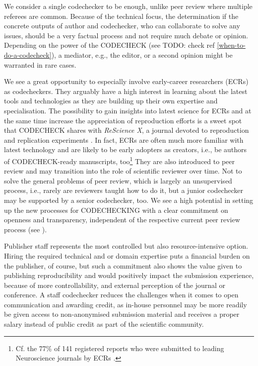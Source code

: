 \documentclass[12pt]{article}
\begin{document}
We consider a single codechecker to be enough, unlike peer review where
multiple referees are common. Because of the technical focus, the 
determination if the concrete outputs of author and codechecker, who can
collaborate to solve any issues, should be a very factual process and not
require much debate or opinion. Depending on the power of the CODECHECK
(see TODO: check ref \ref{when-to-do-a-codecheck}), a mediator, e.g., the editor, or a
second opinion might be warranted in rare cases.

We see a great opportunity to especially involve early-career researchers
(ECRs) as codecheckers. They arguably have a high interest in learning
about the latest tools and technologies as they are building up their own
expertise and specialisation. The possibility to gain insights into latest
science for ECRs and at the same time increase the appreciation of
reproduction efforts is a sweet spot that CODECHECK shares
with \emph{ReScience X}, a journal devoted to reproduction and replication 
experiments \cite{roesch_new_2020}.
In fact, ECRs are often much more familiar with latest technology and are 
likely to be early adopters as creators, i.e., be authors of CODECHECK-ready manuscripts, too\footnote{Cf. the 77\% of 141 registered reports who were 
submitted to leading Neuroscience journals by ECRs
\cite{chambers_registered_2019}.}
They are also introduced to peer review and 
may transition into the role of scientific reviewer over time.
Not to solve the general problems of peer review, which is largely an
unsupervised process, i.e., rarely are reviewers taught how to do it, but
a junior codechecker may be supported by a senior codechecker, too.
We see a high potential in setting up the new processes for CODECHECKING with
a clear commitment on openness and transparency, independent of the
respective current peer review process (see ).

Publisher staff represents the most controlled but also resource-intensive
option. Hiring the required technical and or domain expertise puts a financial
burden on the publisher, of course, but such a commitment also shows the 
value given to publishing reproducibility and would positively impact the 
submission experience, because of more controllability, and external 
perception of the journal or conference. A staff codechecker reduces the 
challenges when it comes to open communication and awarding credit, as
in-house personnel may be more readily be given access to non-anonymised
submission material and receives a proper salary instead of public credit
as part of the scientific community.
\end{document}

